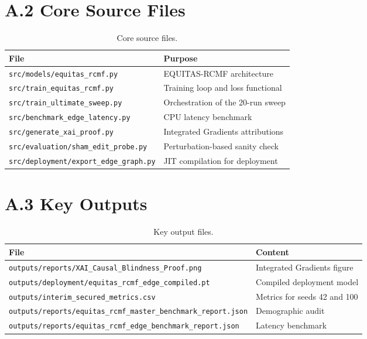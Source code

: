 \section*{A.2 Core Source Files}
\begin{table}[htbp]
\centering
\begin{tabular}{@{}ll@{}}
\toprule
\textbf{File} & \textbf{Purpose} \\
\midrule
\texttt{src/models/equitas\_rcmf.py} & EQUITAS-RCMF architecture \\
\texttt{src/train\_equitas\_rcmf.py} & Training loop and loss functional \\
\texttt{src/train\_ultimate\_sweep.py} & Orchestration of the 20-run sweep \\
\texttt{src/benchmark\_edge\_latency.py} & CPU latency benchmark \\
\texttt{src/generate\_xai\_proof.py} & Integrated Gradients attributions \\
\texttt{src/evaluation/sham\_edit\_probe.py} & Perturbation-based sanity check \\
\texttt{src/deployment/export\_edge\_graph.py} & JIT compilation for deployment \\
\bottomrule
\end{tabular}
\caption{Core source files.}
\end{table}

\section*{A.3 Key Outputs}
\begin{table}[htbp]
\centering
\begin{tabular}{@{}ll@{}}
\toprule
\textbf{File} & \textbf{Content} \\
\midrule
\texttt{outputs/reports/XAI\_Causal\_Blindness\_Proof.png} & Integrated Gradients figure \\
\texttt{outputs/deployment/equitas\_rcmf\_edge\_compiled.pt} & Compiled deployment model \\
\texttt{outputs/interim\_secured\_metrics.csv} & Metrics for seeds 42 and 100 \\
\texttt{outputs/reports/equitas\_rcmf\_master\_benchmark\_report.json} & Demographic audit \\
\texttt{outputs/reports/equitas\_rcmf\_edge\_benchmark\_report.json} & Latency benchmark \\
\bottomrule
\end{tabular}
\caption{Key output files.}
\end{table}

